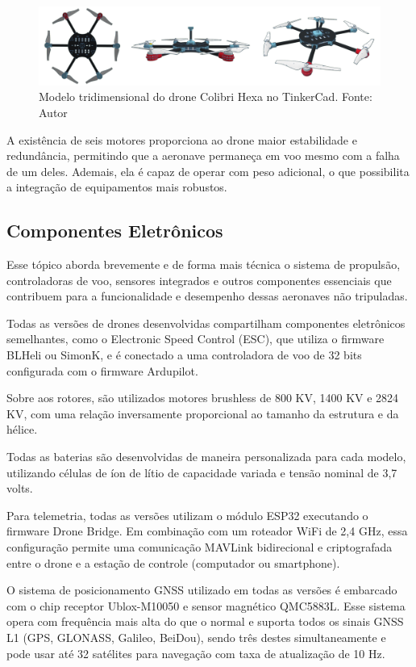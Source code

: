 \documentclass[conference]{IEEEtran}
\begin{document}
\begin{figure}[!htb]
    \centering
    \includegraphics[scale=0.14]{img/Colibri-hexa.png} 
    \caption{Modelo tridimensional do drone Colibri Hexa no TinkerCad. Fonte: Autor}
    \label{fig:my_label}
\end{figure}

A existência de seis motores proporciona ao drone maior estabilidade e redundância, permitindo que a aeronave permaneça em voo mesmo com a falha de um deles. Ademais, ela é capaz de operar com peso adicional, o que possibilita a integração de equipamentos mais robustos.

\subsection{Componentes Eletrônicos}

Esse tópico aborda brevemente e de forma mais técnica o sistema de propulsão, controladoras de voo, sensores integrados e outros componentes essenciais que contribuem para a funcionalidade e desempenho dessas aeronaves não tripuladas.

Todas as versões de drones desenvolvidas compartilham componentes eletrônicos semelhantes, como o Electronic Speed Control (ESC), que utiliza o firmware BLHeli ou SimonK, e é conectado a uma controladora de voo de 32 bits configurada com o firmware Ardupilot.

Sobre aos rotores, são utilizados motores brushless de 800 KV, 1400 KV e 2824 KV, com uma relação inversamente proporcional ao tamanho da estrutura e da hélice.

Todas as baterias são desenvolvidas de maneira personalizada para cada modelo, utilizando células de íon de lítio de capacidade variada e tensão nominal de 3,7 volts.

Para telemetria, todas as versões utilizam o módulo ESP32 executando o firmware Drone Bridge. Em combinação com um roteador WiFi de 2,4 GHz, essa configuração permite uma comunicação MAVLink bidirecional e criptografada entre o drone e a estação de controle (computador ou smartphone).

O sistema de posicionamento GNSS utilizado em todas as versões é embarcado com o chip receptor Ublox-M10050 e sensor magnético QMC5883L. Esse sistema opera com frequência mais alta do que o normal e suporta todos os sinais GNSS L1 (GPS, GLONASS, Galileo, BeiDou), sendo três destes simultaneamente e pode usar até 32 satélites para navegação com taxa de atualização de 10 Hz.
\end{document}
